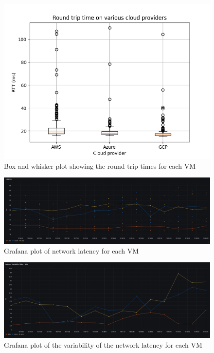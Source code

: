 \documentclass[11pt,a4paper]{article}
\begin{document}
\begin{figure}
\includegraphics[width=\textwidth]{boxplot.png}
\caption{Box and whisker plot showing the round trip times for each VM}
\label{boxplot}
\end{figure}

\begin{figure}
\label{latency}
\includegraphics[width=\textwidth]{Latency.jpeg}
\caption{Grafana plot of network latency for each VM}
\end{figure}

\begin{figure}
\label{latency-var}
\includegraphics[width=\textwidth]{LatencyVar.jpeg}
\caption{Grafana plot of the variability of the network latency for each VM}
\end{figure}
\end{document}
